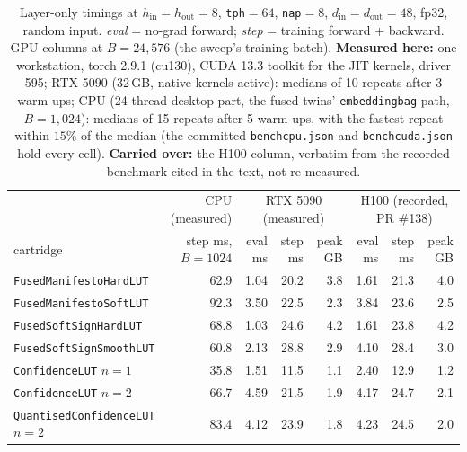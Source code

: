 \documentclass[11pt]{article}
\DeclareRobustCommand{\code}[1]{{\renewcommand{\_}{\textunderscore\allowbreak}\texttt{#1}}}
\begin{document}
\begin{table}[h]
\centering\footnotesize
\setlength{\tabcolsep}{3.6pt}
\begin{tabular}{@{}l r rrr rrr@{}}
\toprule
& CPU (measured) & \multicolumn{3}{c}{RTX 5090 (measured)} & \multicolumn{3}{c}{H100 (recorded, PR \#138)} \\
\cmidrule(lr){2-2}\cmidrule(lr){3-5}\cmidrule(l){6-8}
cartridge & step ms, $B{=}1024$ & eval ms & step ms & peak GB & eval ms & step ms & peak GB \\
\midrule
\code{FusedManifestoHardLUT}        & 62.9 & 1.04 & 20.2 & 3.8 & 1.61 & 21.3 & 4.0 \\
\code{FusedManifestoSoftLUT}        & 92.3 & 3.50 & 22.5 & 2.3 & 3.84 & 23.6 & 2.5 \\
\code{FusedSoftSignHardLUT}         & 68.8 & 1.03 & 24.6 & 4.2 & 1.61 & 23.8 & 4.2 \\
\code{FusedSoftSignSmoothLUT}       & 60.8 & 2.13 & 28.8 & 2.9 & 4.10 & 28.4 & 3.0 \\
\code{ConfidenceLUT} $n{=}1$        & 35.8 & 1.51 & 11.5 & 1.1 & 2.40 & 12.9 & 1.2 \\
\code{ConfidenceLUT} $n{=}2$        & 66.7 & 4.59 & 21.5 & 1.9 & 4.17 & 24.7 & 2.1 \\
\code{QuantisedConfidenceLUT} $n{=}2$ & 83.4 & 4.12 & 23.9 & 1.8 & 4.23 & 24.5 & 2.0 \\
\bottomrule
\end{tabular}
\caption{Layer-only timings at $h_\text{in}=h_\text{out}=8$, \code{tph}$=64$, \code{nap}$=8$,
$d_\text{in}=d_\text{out}=48$, fp32, random input. \emph{eval} = no-grad forward; \emph{step} = training
forward + backward. GPU columns at $B=24{,}576$ (the sweep's training batch). \textbf{Measured here:}
one workstation, torch 2.9.1 (cu130), CUDA 13.3 toolkit for the JIT kernels, driver 595; RTX 5090 (32\,GB,
native kernels active): medians of 10 repeats after 3 warm-ups; CPU (24-thread desktop part, the fused
twins' \code{embedding\_bag} path, $B=1{,}024$): medians of 15 repeats after 5 warm-ups, with the
fastest repeat within $15\%$ of the median (the committed \code{bench\_cpu.json} and
\code{bench\_cuda.json} hold every cell). \textbf{Carried over:} the H100 column, verbatim from the
recorded benchmark cited in the text, not re-measured.}
\label{tab:bench}
\end{table}
\end{document}
